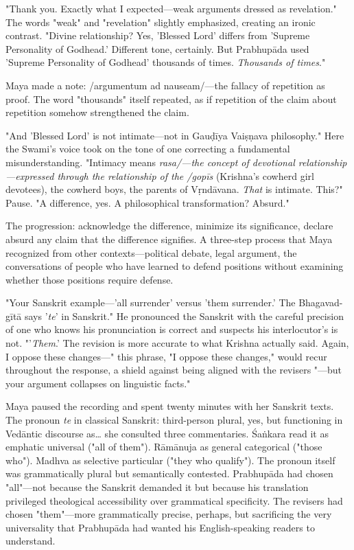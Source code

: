 \documentclass[12pt,twoside]{book}
\begin{document}
"Thank you. Exactly what I expected—weak arguments dressed as revelation." The words "weak" and "revelation" slightly emphasized, creating an ironic contrast. "Divine relationship? Yes, 'Blessed Lord' differs from 'Supreme Personality of Godhead.' Different tone, certainly. But Prabhupāda used 'Supreme Personality of Godhead' thousands of times. \emph{Thousands of times}."

Maya made a note: /argumentum ad nauseam/—the fallacy of repetition as proof. The word "thousands" itself repeated, as if repetition of the claim about repetition somehow strengthened the claim.

"And 'Blessed Lord' is not intimate—not in Gauḍīya Vaiṣṇava philosophy." Here the Swami's voice took on the tone of one correcting a fundamental misunderstanding. "Intimacy means \emph{rasa/—the concept of devotional relationship—expressed through the relationship of the /gopīs} (Krishna's cowherd girl devotees), the cowherd boys, the parents of Vṛndāvana. \emph{That} is intimate. This?" Pause. "A difference, yes. A philosophical transformation? Absurd."

The progression: acknowledge the difference, minimize its significance, declare absurd any claim that the difference signifies. A three-step process that Maya recognized from other contexts—political debate, legal argument, the conversations of people who have learned to defend positions without examining whether those positions require defense.

"Your Sanskrit example—'all surrender' versus 'them surrender.' The Bhagavad-gītā says '\emph{te}' in Sanskrit." He pronounced the Sanskrit with the careful precision of one who knows his pronunciation is correct and suspects his interlocutor's is not. "'\emph{Them}.' The revision is more accurate to what Krishna actually said. Again, I oppose these changes—" this phrase, "I oppose these changes," would recur throughout the response, a shield against being aligned with the revisers "—but your argument collapses on linguistic facts."

Maya paused the recording and spent twenty minutes with her Sanskrit texts. The pronoun \emph{te} in classical Sanskrit: third-person plural, yes, but functioning in Vedāntic discourse as\ldots{} she consulted three commentaries. Śaṅkara read it as emphatic universal ("all of them"). Rāmānuja as general categorical ("those who"). Madhva as selective particular ("they who qualify"). The pronoun itself was grammatically plural but semantically contested. Prabhupāda had chosen "all"—not because the Sanskrit demanded it but because his translation privileged theological accessibility over grammatical specificity. The revisers had chosen "them"—more grammatically precise, perhaps, but sacrificing the very universality that Prabhupāda had wanted his English-speaking readers to understand.
\end{document}
